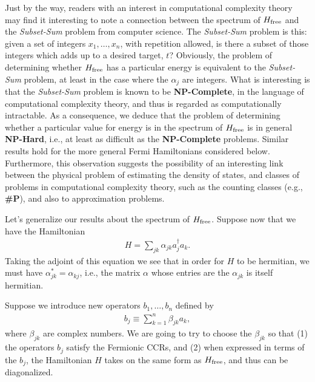 \documentclass[12pt]{article}
\begin{document}
Just by the way, readers with an interest in computational complexity
theory may find it interesting to note a connection between the
spectrum of $H_{\rm free}$ and the \emph{Subset-Sum} problem from
computer science.  The \emph{Subset-Sum} problem is this: given a set
of integers $x_1,\ldots,x_n$, with repetition allowed, is there a
subset of those integers which adds up to a desired target, $t$?
Obviously, the problem of determining whether $H_{\rm free}$ has a
particular energy is equivalent to the \emph{Subset-Sum} problem, at
least in the case where the $\alpha_j$ are integers.  What is
interesting is that the \emph{Subset-Sum} problem is known to be
\textbf{NP-Complete}, in the language of computational complexity
theory, and thus is regarded as computationally intractable.  As a
consequence, we deduce that the problem of determining whether a
particular value for energy is in the spectrum of $H_{\rm free}$ is in
general \textbf{NP-Hard}, i.e., at least as difficult as the
\textbf{NP-Complete} problems.  Similar results hold for the more
general Fermi Hamiltonians considered below.  Furthermore, this
observation suggests the possibility of an interesting link between
the physical problem of estimating the density of states, and classes
of problems in computational complexity theory, such as the counting
classes (e.g., \textbf{\#P}), and also to approximation problems.

Let's generalize our results about the spectrum of $H_{\rm free}$.
Suppose now that we have the Hamiltonian
\begin{eqnarray}
  H = \sum_{jk} \alpha_{jk} a_j^\dagger a_k. 
\end{eqnarray}
Taking the adjoint of this equation we see that in order for $H$ to be
hermitian, we must have $\alpha_{jk}^* = \alpha_{kj}$, i.e., the
matrix $\alpha$ whose entries are the $\alpha_{jk}$ is itself
hermitian.

Suppose we introduce new operators $b_1,\ldots,b_n$ defined by
\begin{eqnarray}
  b_j \equiv \sum_{k=1}^n \beta_{jk} a_k,
\end{eqnarray}
where $\beta_{jk}$ are complex numbers.  We are going to try to choose
the $\beta_{jk}$ so that (1) the operators $b_j$ satisfy the Fermionic
CCRs, and (2) when expressed in terms of the $b_j$, the Hamiltonian
$H$ takes on the same form as $H_{\rm free}$, and thus can be
diagonalized.
\end{document}
